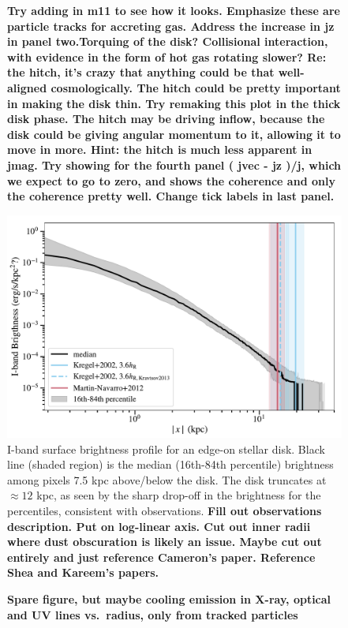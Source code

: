 \documentclass[fleqn,usenatbib]{mnras}
\begin{document}
\begin{figure}
{\textbf{
Try adding in m11 to see how it looks.
Emphasize these are particle tracks for accreting gas.
Address the increase in jz in panel two.Torquing of the disk? Collisional interaction, with evidence in the form of hot gas rotating slower?
Re: the hitch, it's crazy that anything could be that well-aligned cosmologically. The hitch could be pretty important in making the disk thin. Try remaking this plot in the thick disk phase.
The hitch may be driving inflow, because the disk could be giving angular momentum to it, allowing it to move in more.
Hint: the hitch is much less apparent in jmag.
Try showing for the fourth panel ( jvec - jz )/j, which we expect to go to zero, and shows the coherence and only the coherence pretty well.
Change tick labels in last panel.
}
}
\label{f: before and after}
\end{figure}

\begin{figure}
\centering
\includegraphics[width=\columnwidth]{figures/brightness_profile.pdf}
\caption{
I-band surface brightness profile for an edge-on stellar disk.
Black line (shaded region) is the median (16th-84th percentile) brightness among pixels 7.5 kpc above/below the disk.
The disk truncates at $\approx 12$ kpc, as seen by the sharp drop-off in the brightness for the percentiles, consistent with observations.
\textbf{
Fill out observations description.
Put on log-linear axis.
Cut out inner radii where dust obscuration is likely an issue.
Maybe cut out entirely and just reference Cameron's paper.
Reference Shea and Kareem's papers.
}
}
\label{f:stellar_profile}
\end{figure}

\begin{figure}
    \centering
    \caption{
    \textbf{Spare figure, but maybe
    cooling emission in X-ray, optical and UV lines vs.\ radius, only from tracked particles
    }
    }
    \label{f: emission}
\end{figure}
\end{document}
